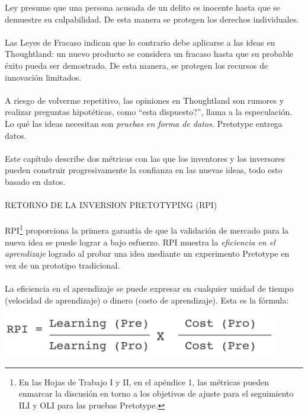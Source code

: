 \documentclass{article}
\begin{document}
Ley presume que una persona acusada de un delito es inocente hasta que se demuestre su culpabilidad. De esta manera se protegen los derechos individuales.
\\ \\
Las Leyes de Fracaso indican que lo contrario debe aplicarse a las ideas en Thoughtland: un nuevo producto se considera un fracaso hasta que su probable \'exito pueda ser demostrado. De esta manera, se protegen los recursos de innovaci\'on limitados. 
\\ \\
A riesgo de volverme repetitivo, las opiniones en Thoughtland son rumores y realizar preguntas hipot\'eticas, como ``esta dispuesto?'', llama a la especulaci\'on. Lo qu\'e las ideas necesitan son \textit{pruebas en forma de datos.} Pretotype entrega datos.
\\ \\
Este cap\'itulo describe dos m\'etricas con las que los inventores y los inversores pueden construir progresivamente la confianza en las nuevas ideas, todo esto basado en datos.
\\ \\
RETORNO DE LA INVERSION PRETOTYPING (RPI)
\\ \\
RPI\footnote{En las Hojas de Trabajo I y II, en el ap\'endice 1, las m\'etricas pueden enmarcar la discusi\'on en torno a los objetivos de ajuste para el seguimiento ILI y OLI para las pruebas Pretotype.} proporciona la primera garant\'ia de que la validaci\'on de mercado para la nueva idea se puede lograr a bajo esfuerzo. RPI muestra la \textit{eficiencia en el aprendizaje} logrado al probar una idea mediante un experimento Pretotype en vez de un prototipo tradicional.
\\ \\
La eficiencia en el aprendizaje se puede expresar en cualquier unidad de tiempo (velocidad de aprendizaje) o dinero (costo de aprendizaje). Esta es la f\'ormula:

\begin{center}
    \includegraphics[width=0.9\textwidth]{RPI}
\end{center}
\end{document}
